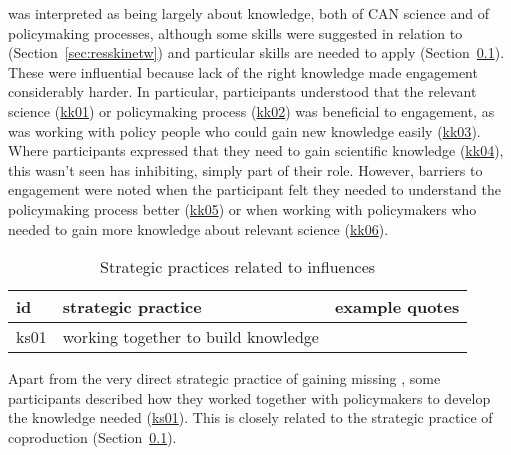 \skiskil{} was interpreted as being largely about knowledge, both of CAN science and of policymaking processes, although some skills were suggested in relation to \skinetw{} (Section~\ref{sec:resskinetw}) and particular skills are needed to apply \skitech{} (Section~\ref{sec:resskitech}). These were influential because lack of the right knowledge made engagement considerably harder. In particular, participants understood that the relevant science (\hyperref[tab:resskiskil]{kk01}) or policymaking process (\hyperref[tab:resskiskil]{kk02}) was beneficial to engagement, as was working with policy people who could gain new knowledge easily (\hyperref[tab:resskiskil]{kk03}). Where participants expressed that they need to gain scientific knowledge (\hyperref[tab:resskiskil]{kk04}), this wasn't seen has inhibiting, simply part of their role. However, barriers to engagement were noted when the participant felt they needed to understand the policymaking process better (\hyperref[tab:resskiskil]{kk05}) or when working with policymakers who needed to gain more knowledge about relevant science (\hyperref[tab:resskiskil]{kk06}). 

\begin{table}[!ht]
\footnotesize
\caption{Strategic practices related to \skiskil{} influences}\label{tab:resskiskilstrat}
\begin{tabular}{L{.06\linewidth}L{.3\linewidth}L{.64\linewidth}} \hline
\textbf{id} & \textbf{strategic practice} & \textbf{example quotes} \\ \hline \hline
ks01 & working together to build knowledge &  \\[5mm]
\hline
 \end{tabular}
\end{table}

Apart from the very direct strategic practice of gaining missing \skiskil, some participants described how they worked together with policymakers to develop the knowledge needed (\hyperref[tab:resskiskilstrat]{ks01}). This is closely related to the strategic practice of coproduction (Section~\ref{sec:resskitech}).

\subsection{\tittech}\label{sec:resskitech}

